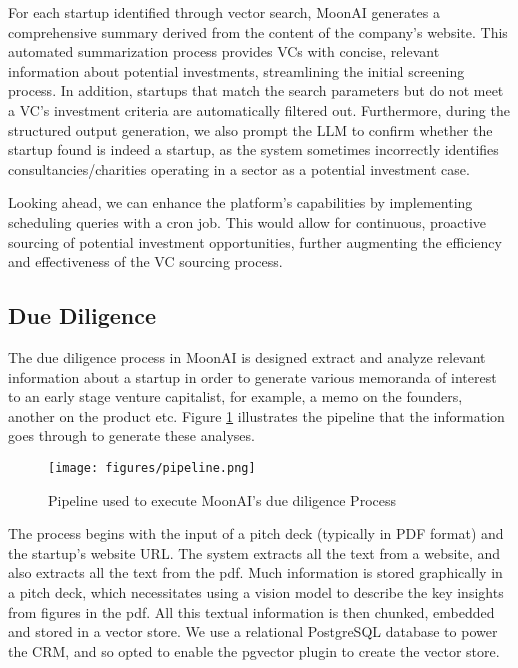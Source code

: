 \documentclass[a4paper, oneside]{discothesis}
\begin{document}
For each startup identified through vector search, MoonAI generates a comprehensive summary derived from the content of the company's website. This automated summarization process provides VCs with concise, relevant information about potential investments, streamlining the initial screening process. In addition, startups that match the search parameters but do not meet a VC's investment criteria are automatically filtered out. Furthermore, during the structured output generation, we also prompt the LLM to confirm whether the startup found is indeed a startup, as the system sometimes incorrectly identifies consultancies/charities operating in a sector as a potential investment case. 

Looking ahead, we can enhance the platform's capabilities by implementing scheduling queries with a cron job. This would allow for continuous, proactive sourcing of potential investment opportunities, further augmenting the efficiency and effectiveness of the VC sourcing process.

\subsection{Due Diligence}

The due diligence process in MoonAI is designed extract and analyze relevant information about a startup in order to generate various memoranda of interest to an early stage venture capitalist, for example, a memo on the founders, another on the product etc. Figure \ref{fig:due_diligence_arch} illustrates the pipeline that the information goes through to generate these analyses.

\begin{figure}[h]
    \centering
    \texttt{[image: figures/pipeline.png]}
    \caption{Pipeline used to execute MoonAI's due diligence Process}
    \label{fig:due_diligence_arch}
\end{figure}

The process begins with the input of a pitch deck (typically in PDF format) and the startup's website URL. The system extracts all the text from a website, and also extracts all the text from the pdf. Much information is stored graphically in a pitch deck, which necessitates using a vision model to describe the key insights from figures in the pdf. All this textual information is then chunked, embedded and stored in a vector store. We use a relational PostgreSQL database to power the CRM, and so opted to enable the pgvector plugin to create the vector store.
\end{document}
